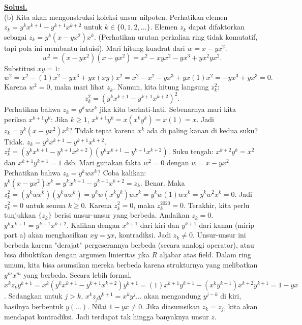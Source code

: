 \documentclass[12pt,twoside]{article}
\newenvironment{solution}
{
	\par\noindent\textbf{\underline{Solusi.}}\\
}
{
	\par
}
\begin{document}
\begin{enumerate}
\begin{solution}
          (b) Kita akan mengonstruksi koleksi unsur nilpoten.
          Perhatikan elemen $z_{k} = y^k x^{k+1} - y^{k+1} x^{k+2}$ untuk $k \in \{0, 1, 2, \dots\}$.
          Elemen $z_k$ dapat difaktorkan sebagai $z_k = y^k (x - yx^2) x^k$. (Perhatikan urutan perkalian ring tidak komutatif, tapi pola ini membantu intuisi).
          Mari hitung kuadrat dari $w = x - yx^2$.
          \[ w^2 = (x - yx^2)(x - yx^2) = x^2 - xyx^2 - yx^3 + yx^2yx^2. \]
          Substitusi $xy=1$:
          \[ w^2 = x^2 - (1)x^2 - yx^3 + yx(xy)x^2 = x^2 - x^2 - yx^3 + yx(1)x^2 = -yx^3 + yx^3 = 0. \]
          Karena $w^2 = 0$, maka mari lihat $z_k$. Namun, kita hitung langsung $z_k^2$:
          \[ z_k^2 = (y^k x^{k+1} - y^{k+1} x^{k+2})^2. \]
          Perhatikan bahwa $z_k = y^k w x^{k}$ jika kita berhati-hati. Sebenarnya mari kita periksa $x^{k+1} y^k$:
          Jika $k \ge 1$, $x^{k+1} y^k = x (x^k y^k) = x(1) = x$.
          Jadi $z_k = y^k (x - yx^2) x^k$? Tidak tepat karena $x^k$ ada di paling kanan di kedua suku? Tidak.
          $z_k = y^k x^{k+1} - y^{k+1} x^{k+2}$.
          $z_k^2 = (y^k x^{k+1} - y^{k+1} x^{k+2}) (y^k x^{k+1} - y^{k+1} x^{k+2})$.
          Suku tengah: $x^{k+2} y^k = x^2$ dan $x^{k+1} y^{k+1} = 1$ dsb.
          Mari gunakan fakta $w^2=0$ dengan $w = x - yx^2$.
          Perhatikan bahwa $z_k = y^k w x^k$? Coba kalikan:
          $y^k (x - yx^2) x^k = y^k x^{k+1} - y^{k+1} x^{k+2} = z_k$. Benar.
          Maka $z_k^2 = (y^k w x^k)(y^k w x^k) = y^k w (x^k y^k) w x^k = y^k w (1) w x^k = y^k w^2 x^k = 0$.
          Jadi $z_k^2 = 0$ untuk semua $k \ge 0$.
          Karena $z_k^2 = 0$, maka $z_k^{2020} = 0$.
          Terakhir, kita perlu tunjukkan $\{z_k\}$ berisi unsur-unsur yang berbeda.
          Andaikan $z_k = 0$. $y^k x^{k+1} = y^{k+1} x^{k+2}$.
          Kalikan dengan $x^{k+1}$ dari kiri dan $y^{k+1}$ dari kanan (mirip part a) akan menghasilkan $xy=yx$, kontradiksi. Jadi $z_k \ne 0$.
          Unsur-unsur ini berbeda karena "derajat" pergeserannya berbeda (secara analogi operator), atau bisa dibuktikan dengan argumen linieritas jika $R$ aljabar atas field. Dalam ring umum, kita bisa asumsikan mereka berbeda karena strukturnya yang melibatkan $y^m x^m$ yang berbeda.
          Secara lebih formal, $x^k z_k y^{k+1} = x^k (y^k x^{k+1} - y^{k+1} x^{k+2}) y^{k+1} = (1) x^{k+1} y^{k+1} - (x^k y^{k+1}) x^{k+2} y^{k+1} = 1 - y x$.
          Sedangkan untuk $j > k$, $x^k z_j y^{k+1} = x^k y^j \dots $ akan mengandung $y^{j-k}$ di kiri, hasilnya berbentuk $y(\dots)$.
          Nilai $1-yx \ne 0$. Jika diasumsikan $z_k = z_j$, kita akan mendapat kontradiksi.
          Jadi terdapat tak hingga banyaknya unsur $z$.
        \end{solution}


\end{enumerate}
\end{document}
